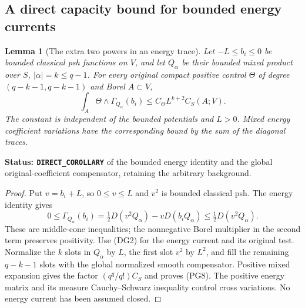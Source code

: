 \documentclass[11pt,a4paper]{article}
\numberwithin{equation}{section}
\newtheorem{lemma}[theorem]{Lemma}
\theoremstyle{definition}
\theoremstyle{remark}
\begin{document}
\subsection{A direct capacity bound for bounded energy currents}

\begin{lemma}[The extra two powers in an energy trace]
\label{lem:r11-bounded-energy-capacity-power}
Let $-L\leq b_i\leq0$ be bounded classical psh functions on $V$,
and let $Q_\alpha$ be their bounded mixed product over $S$,
$|\alpha|=k\leq q-1$. For every original compact positive
control $\Theta$ of degree $(q-k-1,q-k-1)$ and Borel $A\subset V$,
\[
       \int_A\Theta\wedge\Gamma_{Q_\alpha}(b_i)
                 \leq C_\Theta L^{k+2}C_S(A;V).
 \tag{PG8}
\]
The constant is independent of the bounded potentials and $L>0$.
Mixed energy coefficient variations have the corresponding
bound by the sum of the diagonal traces.
\end{lemma}

\noindent\textbf{Status: \texttt{DIRECT\_COROLLARY}} of
the bounded energy identity and the global original-coefficient
compensator, retaining the arbitrary background.

\begin{proof}
Put $v=b_i+L$, so $0\leq v\leq L$ and $v^2$ is bounded
classical psh. The energy identity gives
\[
 0\leq\Gamma_{Q_\alpha}(b_i)
       =\tfrac12D(v^2Q_\alpha)-vD(b_iQ_\alpha)
       \leq\tfrac12D(v^2Q_\alpha).
 \tag{PG9}
\]
These are middle-cone inequalities; the nonnegative Borel
multiplier in the second term preserves positivity.
Use (DG2) for the energy current and its original test.
Normalize the $k$ slots in $Q_\alpha$ by $L$, the first
slot $v^2$ by $L^2$, and fill the remaining $q-k-1$ slots
with the global normalized smooth compensator. Positive
mixed expansion gives the factor $(q^q/q!)C_S$ and proves
(PG8). The positive energy matrix and its measure
Cauchy--Schwarz inequality control cross variations.
No energy current has been assumed closed.
\end{proof}
\end{document}
